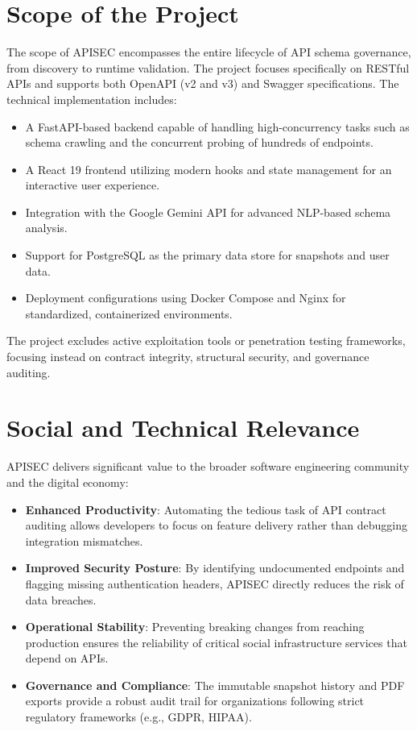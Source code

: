 \documentclass{fisatprojectfinal}
\begin{document}
\section{Scope of the Project}
The scope of APISEC encompasses the entire lifecycle of API schema governance, from discovery to runtime validation. The project focuses specifically on RESTful APIs and supports both OpenAPI (v2 and v3) and Swagger specifications. The technical implementation includes:
\begin{itemize}
    \item A FastAPI-based backend capable of handling high-concurrency tasks such as schema crawling and the concurrent probing of hundreds of endpoints.
    \item A React 19 frontend utilizing modern hooks and state management for an interactive user experience.
    \item Integration with the Google Gemini API for advanced NLP-based schema analysis.
    \item Support for PostgreSQL as the primary data store for snapshots and user data.
    \item Deployment configurations using Docker Compose and Nginx for standardized, containerized environments.
\end{itemize}
The project excludes active exploitation tools or penetration testing frameworks, focusing instead on contract integrity, structural security, and governance auditing.

\section{Social and Technical Relevance}
APISEC delivers significant value to the broader software engineering community and the digital economy:
\begin{itemize}
    \item \textbf{Enhanced Productivity}: Automating the tedious task of API contract auditing allows developers to focus on feature delivery rather than debugging integration mismatches.
    \item \textbf{Improved Security Posture}: By identifying undocumented endpoints and flagging missing authentication headers, APISEC directly reduces the risk of data breaches.
    \item \textbf{Operational Stability}: Preventing breaking changes from reaching production ensures the reliability of critical social infrastructure services that depend on APIs.
    \item \textbf{Governance and Compliance}: The immutable snapshot history and PDF exports provide a robust audit trail for organizations following strict regulatory frameworks (e.g., GDPR, HIPAA).
\end{itemize}
\end{document}
